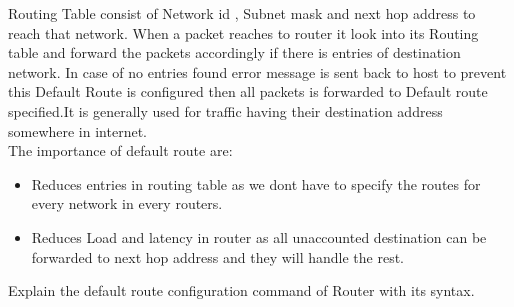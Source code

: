 \documentclass[a4paper,11pt]{article}
\begin{document}
\begin{A}
    {
        Routing Table consist of Network id , Subnet mask and next hop address to reach that network. When a packet reaches to router it look into its Routing table and forward the packets accordingly if there is entries of destination network. In case of no entries found error message is sent back to host to prevent this Default Route is configured then all packets is forwarded to Default route specified.It is generally used for traffic having their destination address somewhere in internet.\\


        The importance of default route are:
        \begin{itemize}
            \item Reduces entries in routing table  as we dont have to specify the routes for every network in every routers.
            \item Reduces Load and latency in router as all unaccounted destination can be forwarded to next hop address and they will handle the rest.
        \end{itemize}



    }
\end{A}

\begin{Q}
    {
        Explain the default route configuration command of Router with its syntax.
    }
\end{Q}
\end{document}
